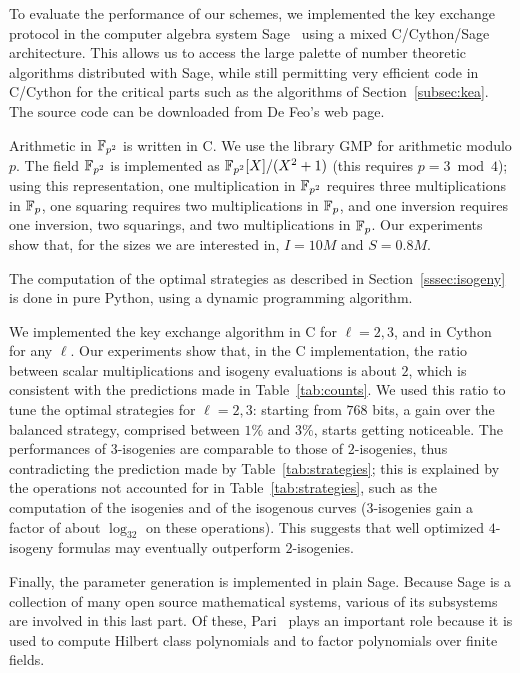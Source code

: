 To evaluate the performance of our schemes, we implemented the key
exchange protocol in the computer algebra system Sage~\cite{Sage}
using a mixed C/Cython/Sage architecture. This allows us to access the
large palette of number theoretic algorithms distributed with Sage,
while still permitting very efficient code in C/Cython for the
critical parts such as the algorithms of Section~\ref{subsec:kea}. The
source code can be downloaded from De Feo's web page.

Arithmetic in ${\mathbb{F}}_{p^2}$ is written in C. We use the library GMP for
arithmetic modulo $p$. The field ${\mathbb{F}}_{p^2}$ is implemented as
${\mathbb{F}}_{p^2}[X]/(X^2+1)$ (this requires $p=3\bmod4$); using this
representation, one multiplication in ${\mathbb{F}}_{p^2}$ requires three
multiplications in ${\mathbb{F}}_p$, one squaring requires two
multiplications in ${\mathbb{F}}_p$, and one inversion requires one
inversion, two squarings, and two multiplications in ${\mathbb{F}}_p$. Our
experiments show that, for the sizes we are interested in, $I=10M$ and
$S=0.8M$.

The computation of the optimal strategies as described in
Section~\ref{sssec:isogeny} is done in pure Python, using a dynamic
programming algorithm.

We implemented the key exchange algorithm in C for $\ell=2,3$, and in
Cython for any $\ell$. Our experiments show that, in the C
implementation, the ratio between scalar multiplications and isogeny
evaluations is about $2$, which is consistent with the predictions
made in Table~\ref{tab:counts}. We used this ratio to tune the optimal
strategies for $\ell=2,3$: starting from $768$ bits, a gain over the
balanced strategy, comprised between $1\%$ and $3\%$, starts getting
noticeable. The performances of $3$-isogenies are comparable to those
of $2$-isogenies, thus contradicting the prediction made by
Table~\ref{tab:strategies}; this is explained by the operations not
accounted for in Table~\ref{tab:strategies}, such as the computation
of the isogenies and of the isogenous curves ($3$-isogenies gain a
factor of about $\log_32$ on these operations). This suggests that
well optimized $4$-isogeny formulas may eventually outperform
$2$-isogenies.

Finally, the parameter generation is implemented in plain
Sage. Because Sage is a collection of many open source mathematical
systems, various of its subsystems are involved in this last part. Of
these, Pari~\cite{Pari} plays an important role because it is used to
compute Hilbert class polynomials and to factor polynomials over
finite fields.


